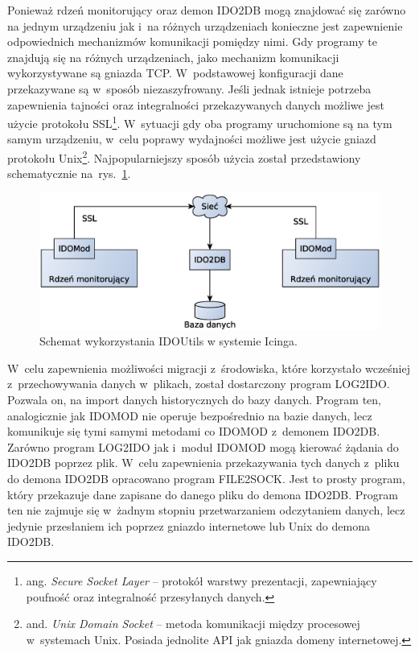 Ponieważ rdzeń monitorujący oraz demon IDO2DB mogą znajdować się
zarówno na jednym urządzeniu jak i~na różnych urządzeniach konieczne
jest zapewnienie odpowiednich mechanizmów komunikacji pomiędzy nimi.
Gdy programy te znajdują się na różnych urządzeniach, jako mechanizm
komunikacji wykorzystywane są gniazda TCP. W~podstawowej konfiguracji
dane przekazywane są w~sposób niezaszyfrowany. Jeśli jednak istnieje
potrzeba zapewnienia tajności oraz integralności przekazywanych danych
możliwe jest użycie protokołu SSL\footnote{ ang. {\em Secure Socket
    Layer} -- protokół warstwy prezentacji, zapewniający poufność oraz
  integralność przesyłanych danych.}. W~sytuacji gdy oba programy
uruchomione są na tym samym urządzeniu, w~celu poprawy wydajności
możliwe jest użycie gniazd protokołu Unix\footnote{ and. {\em Unix
    Domain Socket} -- metoda komunikacji między procesowej w~systemach
  Unix. Posiada jednolite API jak gniazda domeny
  internetowej.}. Najpopularniejszy sposób użycia został przedstawiony
schematycznie na~rys.~\ref{fig:IDOUtils}.

\begin{figure}[ht]
  \caption{Schemat wykorzystania IDOUtils w systemie Icinga.}
  \label{fig:IDOUtils}
\includegraphics[width=1\textwidth]{img/idoutils}
\end{figure}

W~celu zapewnienia możliwości migracji z~środowiska, które korzystało
wcześniej z~przechowywania danych w~plikach, został dostarczony
program LOG2IDO. Pozwala on, na import danych historycznych do bazy
danych. Program ten, analogicznie jak IDOMOD nie operuje bezpośrednio
na bazie danych, lecz komunikuje się tymi samymi metodami co IDOMOD
z~demonem IDO2DB. Zarówno program LOG2IDO jak i~moduł IDOMOD mogą
kierować żądania do IDO2DB poprzez plik. W~celu zapewnienia
przekazywania tych danych z~pliku do demona IDO2DB opracowano program
FILE2SOCK. Jest to prosty program, który przekazuje dane zapisane do
danego pliku do demona IDO2DB. Program ten nie zajmuje się w~żadnym
stopniu przetwarzaniem odczytaniem danych, lecz jedynie przesłaniem ich
poprzez gniazdo internetowe lub Unix do demona IDO2DB.

